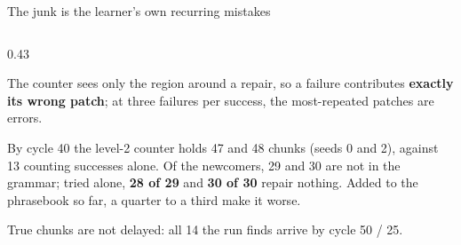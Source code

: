 \documentclass[aspectratio=169,11pt]{beamer}
\newcommand{\redtext}[1]{\textcolor{warmred}{\textbf{#1}}}
\begin{document}
\begin{frame}{The junk is the learner's own recurring mistakes}
\begin{columns}[T]
\begin{column}{0.43\textwidth}
{\footnotesize The counter sees only the region around a repair, so a failure contributes \redtext{exactly its wrong patch}; at three failures per success, the most-repeated patches are errors.\par}

\smallskip
{\footnotesize By cycle 40 the level-2 counter holds 47 and 48 chunks (seeds 0 and 2), against 13 counting successes alone. Of the newcomers, 29 and 30 are not in the grammar; tried alone, \textbf{28 of 29} and \textbf{30 of 30} repair nothing. Added to the phrasebook so far, a quarter to a third make it worse.\par}

\smallskip
{\footnotesize True chunks are not delayed: all 14 the run finds arrive by cycle 50 / 25.\par}
\end{column}


\end{columns}
\end{frame}
\end{document}
